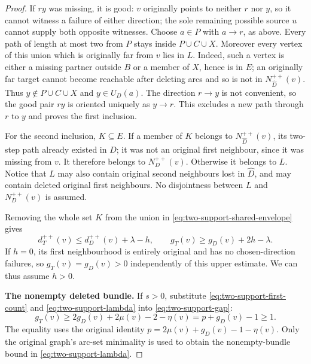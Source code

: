 \begin{proof}
If $ry$ was missing, it is good: $v$ originally points to neither $r$
nor $y$, so it cannot witness a failure of either direction; the sole
remaining possible source $u$ cannot supply both opposite witnesses.
Choose $a\in P$ with $a\to r$, as above.
Every path of length at most two from $P$ stays inside $P\cup C\cup X$.
Moreover every vertex of this union which is originally far from $v$
lies in $L$. Indeed, such a vertex is either a missing partner outside
$B$ or a member of $X$, hence is in $E$; an originally far target cannot
become reachable after deleting arcs and so is not in
$N^{++}_{\widehat D}(v)$.
Thus $y\notin P\cup C\cup X$ and $y\in U_D(a)$.
The direction $r\to y$ is not convenient, so the good pair $ry$ is
oriented uniquely as $y\to r$. This excludes a new path through $r$
to $y$ and proves the first inclusion.

For the second inclusion, $K\subseteq E$. If a member of $K$ belongs
to $N^{++}_{\widehat D}(v)$, its two-step path already existed in $D$;
it was not an original first neighbour, since it was missing from $v$.
It therefore belongs to $N_D^{++}(v)$. Otherwise it belongs to $L$.
Notice that $L$ may also contain original second neighbours lost in
$\widehat D$, and may contain deleted original first neighbours.
No disjointness between $L$ and $N_D^{++}(v)$ is assumed.

Removing the whole set $K$ from the union in
\eqref{eq:two-support-shared-envelope} gives
\begin{equation}\label{eq:two-support-gap}
 d_T^{++}(v)\le d_D^{++}(v)+\lambda-h,
 \qquad g_T(v)\ge g_D(v)+2h-\lambda.
\end{equation}
If $h=0$, its first neighbourhood is entirely original and has no
chosen-direction failures, so $g_T(v)=g_D(v)>0$ independently of this
upper estimate. We can thus assume $h>0$.

\par\medskip\noindent\textbf{The nonempty deleted bundle.}\quad 
If $s>0$, substitute \eqref{eq:two-support-first-count} and
\eqref{eq:two-support-lambda} into \eqref{eq:two-support-gap}:
\[
 g_T(v)\ge2g_D(v)+2\mu(v)-2-\eta(v)
       =p+g_D(v)-1\ge1.
\]
The equality uses the original identity
$p=2\mu(v)+g_D(v)-1-\eta(v)$.
Only the original graph's arc-set minimality is used to obtain the
nonempty-bundle bound in \eqref{eq:two-support-lambda}.


\end{proof}
